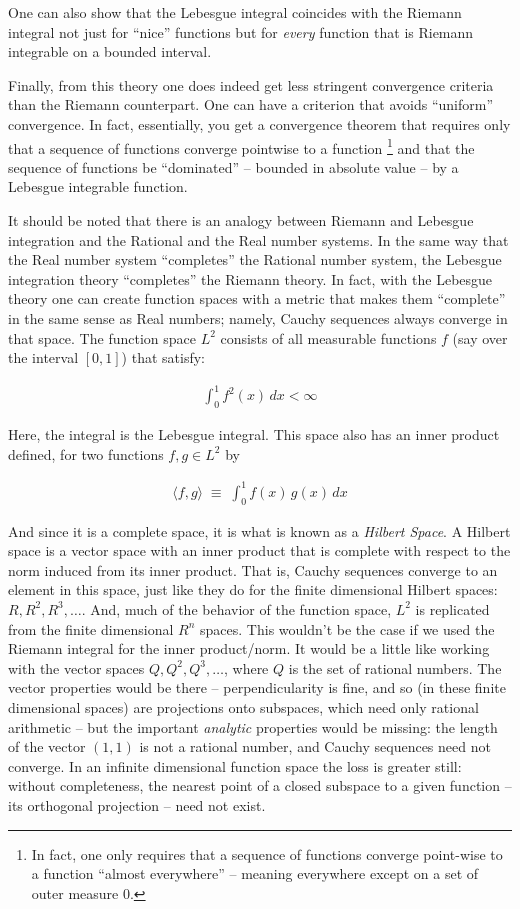 \documentclass{article}
\begin{document}
One can also show that the Lebesgue integral coincides with the Riemann integral 
not just for ``nice'' functions but for {\em every\/} function that is Riemann
integrable on a bounded interval.

Finally, from this theory one does indeed get less stringent convergence 
criteria than the Riemann counterpart. One can have a criterion that avoids 
``uniform'' convergence. In fact, essentially, you get a convergence theorem 
that requires only that a sequence of functions converge pointwise to a function%
\footnote{In fact, one only requires that a sequence of functions converge point-wise
to a function ``almost everywhere'' -- meaning everywhere except on a set of 
outer measure $0$.} and that the sequence of functions
be ``dominated'' -- bounded in absolute value -- by a Lebesgue integrable function.

It should be noted that there is an analogy between Riemann and Lebesgue integration
and the Rational and the Real number systems. In the same way that the Real number
system ``completes'' the Rational number system, the Lebesgue integration
theory ``completes'' the Riemann theory. In fact, with the Lebesgue theory 
one can create function spaces with a metric that makes them ``complete'' 
in the same sense as Real numbers; namely, Cauchy sequences always converge 
in that space. The function space $L^2$ consists of all measurable functions $f$ 
(say over the interval $[0,1]$) that satisfy:

\begin{align*}
\int_0^1 f^2(x) \, dx < \infty
\end{align*}

Here, the integral is the Lebesgue integral. This space also has an inner 
product defined, for two functions $f, g \in L^2$ by

\begin{align*}
\langle f, g \rangle \; \equiv \; \int_0^1 f(x)\, g(x)\, dx
\end{align*}

And since it is a complete space, it is what is known as a {\em Hilbert Space\/}.
A Hilbert space is a vector space with an inner product that is complete with 
respect to the norm induced from its inner product. 
That is, Cauchy sequences converge to an element in this
space, just like they do for the finite dimensional Hilbert spaces: $R, R^2, R^3, \ldots$.
And, much of the behavior of the function space, $L^2$ is replicated from 
the finite dimensional $R^n$ spaces. This wouldn't be the case if we used
the Riemann integral for the inner product/norm. It would be a little like
working with the vector spaces $Q, Q^2, Q^3, \ldots$, where $Q$ is the set
of rational numbers. The vector properties would be there -- perpendicularity
is fine, and so (in these finite dimensional spaces) are projections onto
subspaces, which need only rational arithmetic -- but the important
{\em analytic\/} properties would be missing: the length of the vector
$(1,1)$ is not a rational number, and Cauchy sequences need not converge.
In an infinite dimensional function space the loss is greater still:
without completeness, the nearest point of a closed subspace to a given
function -- its orthogonal projection -- need not exist.
\end{document}
